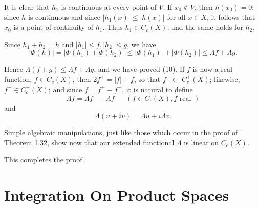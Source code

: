 \documentclass[12pt, a4paper, oneside]{book}
\begin{document}
\begin{theorem}
        It is clear that $h_1$ is continuous at every point of $V$. If $x_0 \notin V$, then $h\left(x_0\right)=0$; since $h$ is continuous and since $\left|h_1(x)\right| \leq|h(x)|$ for all $x \in X$, it follows that $x_0$ is a point of continuity of $h_1$. Thus $h_1 \in C_c(X)$, and the same holds for $h_2$.

        Since $h_1+h_2=h$ and $\left|h_1\right| \leq f,\left|h_2\right| \leq g$, we have
        $$
            |\Phi(h)|=\left|\Phi\left(h_1\right)+\Phi\left(h_2\right)\right| \leq\left|\Phi\left(h_1\right)\right|+\left|\Phi\left(h_2\right)\right| \leq \Lambda f+\Lambda g .
        $$

        Hence $\Lambda(f+g) \leq \Lambda f+\Lambda g$, and we have proved (10).
        If $f$ is now a real function, $f \in C_c(X)$, then $2 f^{+}=|f|+f$, so that $f^{+} \in$ $C_c^{+}(X)$; likewise, $f^{-} \in C_c^{+}(X)$; and since $f=f^{+}-f^{-}$, it is natural to define
        $$
            \Lambda f=\Lambda f^{+}-\Lambda f^{-} \quad\left(f \in C_{\mathrm{r}}(X), f \text { real }\right)
        $$
        and
        $$
            \Lambda(u+i v)=\Lambda u+i \Lambda v .
        $$

        Simple algebraic manipulations, just like those which occur in the proof of Theorem 1.32, show now that our extended functional $\Lambda$ is linear on $C_c(X)$.

    This completes the proof.
\end{theorem}

\chapter{Integration On Product Spaces}
\end{document}

